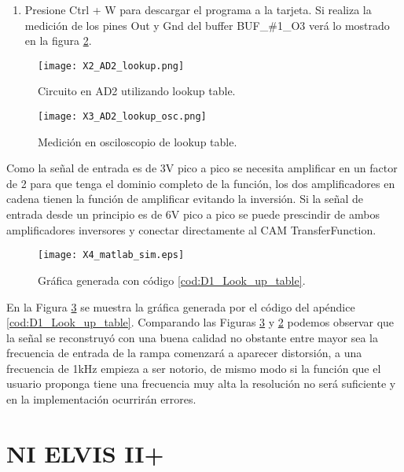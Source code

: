 \begin{enumerate}
		\item Presione Ctrl + W para descargar el programa a la tarjeta. Si realiza la medición de los pines Out y Gnd del buffer BUF\_{}\#{}1\_{}O3 verá lo mostrado en la figura \ref{fig:X3_AD2_lookup_osc}.
	\end{enumerate}
	
	\begin{figure}[!ht]
		\caption{Circuito en AD2 utilizando lookup table.}
		\label{fig:X2_AD2_lookup}
		\centering
		\texttt{[image: X2\_AD2\_lookup.png]}
	\end{figure}	
	
	\begin{figure}[!ht]
		\caption{Medición en osciloscopio de lookup table.}
		\label{fig:X3_AD2_lookup_osc}
		\centering
		\texttt{[image: X3\_AD2\_lookup\_osc.png]}
	\end{figure}

	Como la señal de entrada es de 3V pico a pico se necesita amplificar en un factor de 2 para que tenga el dominio completo de la función, los dos amplificadores en cadena tienen la función de amplificar evitando la inversión. Si la señal de entrada desde un principio es de 6V pico a pico se puede prescindir de ambos amplificadores inversores y conectar directamente al CAM TransferFunction.

	\begin{figure}[!ht]
		\caption{Gráfica generada con código \ref{cod:D1_Look_up_table}.} 
		\label{fig:X4_matlab_sim}
		\centering
		\texttt{[image: X4\_matlab\_sim.eps]}
	\end{figure}

	En la Figura \ref{fig:X4_matlab_sim} se muestra la gráfica generada por el código del apéndice \ref{cod:D1_Look_up_table}. Comparando las Figuras \ref{fig:X4_matlab_sim} y \ref{fig:X3_AD2_lookup_osc} podemos observar que la señal se reconstruyó con una buena calidad no obstante entre mayor sea la frecuencia de entrada de la rampa comenzará a aparecer distorsión, a una frecuencia de 1kHz empieza a ser notorio, de mismo modo si la función que el usuario proponga tiene una frecuencia muy alta la resolución no será suficiente y en la implementación ocurrirán errores.
	
	
	
	
	\vspace{5cm}
	\section{NI ELVIS II+}

